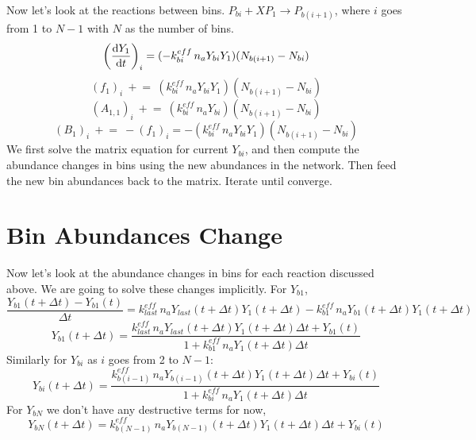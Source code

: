 \documentclass{article}
\begin{document}
Now let's look at the reactions between bins. $P_{bi} + XP_1 \to P_{b(i+1)}$,
where $i$ goes from 1 to $N-1$ with $N$ as the number of bins.
\[
\left( \frac{{\rm d}Y_1}{{\rm d}t}\right) _i =
  ( -k^{eff}_{bi} \, n_a Y_{bi} Y_1 )(N_{b(i+1)} - N_{bi})
\]
\[
(f_{1})_i \: +\!\!= \: 
  (k^{eff}_{bi} \, n_a Y_{bi} Y_1) (N_{b(i+1)} - N_{bi})
\]
\[
(A_{1,1})_i \: +\!\!= \: 
  (k^{eff}_{bi} \, n_a Y_{bi}) (N_{b(i+1)} - N_{bi})
\]
\[
(B_1)_i \:+\!\!=\: -(f_1)_i = 
  -(k^{eff}_{bi} \, n_a Y_{bi} Y_1) (N_{b(i+1)} - N_{bi})
\]
We first solve the matrix equation for current $Y_{bi}$, and then compute
the abundance changes in bins using the new abundances in the network.
Then feed the new bin abundances back to the matrix. Iterate until converge. 

\section{Bin Abundances Change}

Now let's look at the abundance changes in bins for each reaction discussed
above. We are going to solve these changes implicitly. For $Y_{b1}$,
\[
\frac {Y_{b1}(t+\Delta t) - Y_{b1}(t)} {\Delta t} =
  k^{eff}_{last} \, n_a Y_{last}(t+\Delta t) Y_1(t+\Delta t) -
  k^{eff}_{b1} \, n_a Y_{b1}(t+\Delta t) Y_1(t+\Delta t)
\]
\[
Y_{b1}(t+\Delta t) = \frac
  {k^{eff}_{last} \, n_a Y_{last}(t+\Delta t) Y_1(t+\Delta t) \Delta t +
    Y_{b1}(t)}
  {1 + k^{eff}_{b1} \, n_a Y_1(t+\Delta t) \Delta t}
\]
Similarly for $Y_{bi}$ as $i$ goes from 2 to $N-1$:
\[
Y_{bi}(t+\Delta t) = \frac
  {k^{eff}_{b(i-1)} \, n_a Y_{b(i-1)}(t+\Delta t) Y_1(t+\Delta t) \Delta t +
    Y_{bi}(t)}
  {1 + k^{eff}_{bi} \, n_a Y_1(t+\Delta t) \Delta t}
\]
For $Y_{bN}$ we don't have any destructive terms for now,
\[
Y_{bN}(t+\Delta t) = 
  k^{eff}_{b(N-1)} \, n_a Y_{b(N-1)}(t+\Delta t) Y_1(t+\Delta t) \Delta t +
    Y_{bi}(t)
\]
\end{document}
